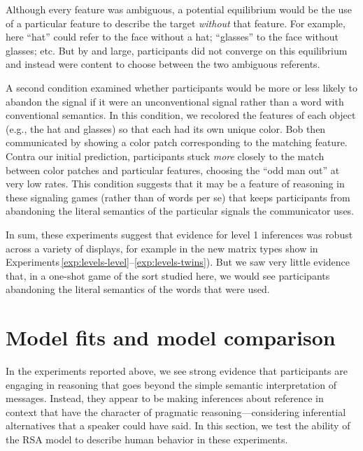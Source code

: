 \documentclass[man,noapacite]{apa2}
\newcounter{Experiment}
\newcommand{\exptrefrange}[2]{Experiments\,\ref{#1}--\ref{#2}}
\begin{document}
\noindent Although every feature was ambiguous, a potential equilibrium would be the use of a particular feature to describe the target \emph{without} that feature. For example, here ``hat'' could refer to the face without a hat; ``glasses'' to the face without glasses; etc. But by and large, participants did not converge on this equilibrium and instead were content to choose between the two ambiguous referents.

A second condition examined whether participants would be more or less likely to abandon the signal if it were an unconventional signal rather than a word with conventional semantics. In this condition, we recolored the features of each object (e.g., the hat and glasses) so that each had its own unique color. Bob then communicated by showing a color patch corresponding to the matching feature. Contra our initial prediction, participants stuck \emph{more} closely to the match between color patches and particular features, choosing the ``odd man out'' at very low rates. This condition suggests that it may be a feature of reasoning in these signaling games (rather than of words per se) that keeps participants from abandoning the literal semantics of the particular signals the communicator uses.

In sum, these experiments suggest that evidence for level 1 inferences was robust across a variety of displays, for example in the new matrix types show in \exptrefrange{exp:levels-level}{exp:levels-twins}). But we saw very little evidence that, in a one-shot game of the sort studied here, we would see participants abandoning the literal semantics of the words that were used.


% 

% 

% 

\section{Model fits and model comparison}
\label{sec:modelcomp}

In the experiments reported above, we see strong evidence that participants are engaging in reasoning that goes beyond the simple semantic interpretation of messages. Instead, they appear to be making inferences about reference in context that have the character of pragmatic reasoning---considering inferential alternatives that a speaker could have said. In this section, we test the ability of the RSA model to describe human behavior in these experiments.
\end{document}

